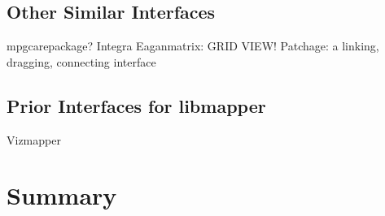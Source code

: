 	\subsection{Other Similar Interfaces}
		mpgcarepackage?
		Integra 
		Eaganmatrix: GRID VIEW! 
		Patchage: a linking, dragging, connecting interface 
	\subsection{Prior Interfaces for libmapper} \label{sec:priorGUIs}
		Vizmapper 
	

\section{Summary}
	